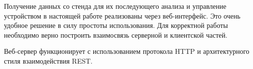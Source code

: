 Получение данных со стенда для их последующего анализа и управление устройством в настоящей работе реализованы через веб-интерфейс. Это очень удобное решение в силу простоты использования. Для корректной работы необходимо верно построить взаимосвязь серверной и клиентской частей.\par
Веб-сервер функционирует с использованием протокола HTTP и архитектурного стиля взаимодействия REST.\par
